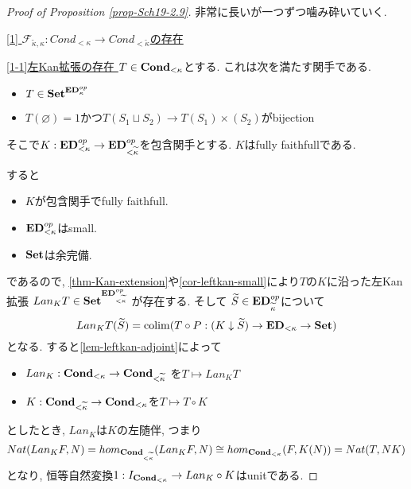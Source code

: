 \documentclass[dvipdfmx,a4paper,11pt]{article}
\newcommand{\colim}{{\rm colim}}
\theoremstyle{definition}
\begin{document}
\begin{proof}[Proof of Proposition \ref{prop-Sch19-2.9}]
非常に長いが一つずつ噛み砕いていく. 

\underline{[1] $\mathcal{F}_{\widetilde{\kappa}, \kappa} :  Cond_{<\kappa} \to Cond_{<\widetilde{\kappa}}$の存在} 

\underline{[1-1]左Kan拡張の存在 }$T \in {\bf Cond_{<\kappa}}$とする.
これは次を満たす関手である.
\begin{itemize}
\item $T \in {\bf Set}^{{\bf ED}_{\kappa}^{op}}$
\item $T(\varnothing)=1$かつ$T(S_1 \sqcup S_2) \to T(S_1) \times (S_2)$がbijection
\end{itemize}
そこで$K : {\bf ED}_{<\kappa}^{op} \to {\bf ED}_{<\widetilde{\kappa}}^{op}$を包含関手とする. 
$K$はfully faithfullである.

すると
\begin{itemize}
\item $K$が包含関手でfully faithfull.
\item ${\bf ED}_{<\kappa}^{op}$はsmall.
\item ${\bf Set }$は余完備.
\end{itemize}
であるので, \ref{thm-Kan-extension}や\ref{cor-leftkan-small}により$T$の$K$に沿った左Kan拡張
$Lan_{K}T \in {\bf Set}^{{\bf ED}_{<\widetilde{\kappa}}^{op}}$
が存在する. そして
$\widetilde{S} \in {\bf ED}_{\widetilde{\kappa}}^{op}$について
$$
Lan_{K}T(\widetilde{S}) = \colim(T \circ P : (K \downarrow \widetilde{S}) \to {\bf ED}_{<\kappa} \to {\bf Set})
$$
となる.
すると\ref{lem-leftkan-adjoint}によって
\begin{itemize}
\item $Lan_{K} : {\bf  Cond_{<\kappa}} \to { \bf Cond_{<\widetilde{\kappa}} }$ を$T \mapsto Lan_{K}T$
\item $K : {\bf Cond_{<\widetilde{\kappa}} }\to {\bf Cond_{< \kappa}} $を$T \mapsto T \circ K$
\end{itemize}
としたとき, 
$Lan_{K}$は$K$の左随伴, つまり
$$
Nat(Lan_{K}F, N)
=
hom_{{\bf Cond_{<\widetilde{\kappa}}} }(Lan_{K}F, N)
 \cong
 hom_{{\bf Cond_{< \kappa}}}(F, K(N)) 
 = Nat(T,NK)
$$
となり, 恒等自然変換$1:  I_{{\bf Cond_{<\kappa}}}\to Lan_{K} \circ K$はunitである. 


\end{proof}
\end{document}
